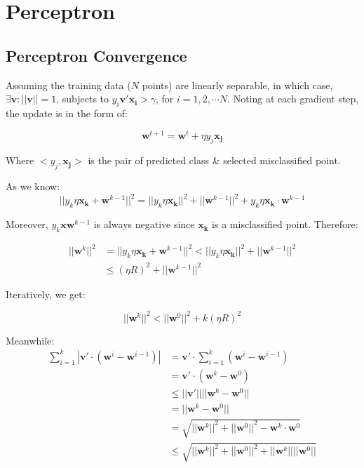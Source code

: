 \documentclass{article}
\newcommand{\V}[1]{\boldsymbol{#1}}
\begin{document}
\section{Perceptron}
\subsection{Perceptron Convergence}
Assuming the training data (\(N\) points) are linearly separable, in which case, 
\(\exists \V{v}: ||\V{v}||=1\), subjects to \(y_i\V{v'}\V{x_i}>\gamma\), for
\(i=1, 2, \cdots N\).
Noting at each gradient step, the update is in the form of:

\begin{equation}
\V{w}^{t+1}=\V{w}^t+\eta y_j\V{x_j}
\end{equation}

Where \(<y_j, \V{x_j}>\) is the pair of predicted class \& selected misclassified point.

As we know:
\begin{equation}
||y_k\eta\V{x_k} +\V{w}^{k-1}||^2=||y_k\eta\V{x_k}||^2+||\V{w}^{k-1}||^2+y_k\eta\V{x_k}\cdot \V{w}^{k-1}
\end{equation}

Moreover, \(y_k\V{x}\V{w}^{k-1}\) is always negative since \(\V{x_k}\) is a
misclassified point. Therefore:

\begin{equation}
\begin{split}
||\V{w}^k||^2&=||y_k\eta\V{x_k} +\V{w}^{k-1}||^2<||y_k\eta \V{x_k}||^2+||\V{w}^{k-1}||^2\\
&\leq (\eta R)^2 + ||\V{w}^{k-1}||^2
\end{split}
\end{equation}

Iteratively, we get:

\begin{equation}
||\V{w}^k||^2<||\V{w}^0||^2+k(\eta R)^2
\end{equation}

Meanwhile:
\begin{equation}
\begin{split}
\sum_{i=1}^k|\V{v'}\cdot (\V{w}^i-\V{w}^{i-1})|&=\V{v'}\cdot\sum_{i=1}^k(\V{w}^i-\V{w}^{i-1})\\
&=\V{v'}\cdot (\V{w}^k-\V{w}^0)\\
&\leq ||\V{v'}||||\V{w}^k-\V{w}^0||\\
&=||\V{w}^k-\V{w}^0||\\
&= \sqrt{||\V{w}^k||^2 + ||\V{w}^0||^2 - \V{w}^k \cdot \V{w}^0}\\
&\leq \sqrt{||\V{w}^k||^2+||\V{w}^0||^2+||\V{w}^k||||\V{w}^0||}
\end{split}
\end{equation}
\end{document}
